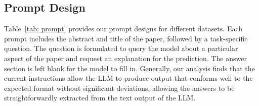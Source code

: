 \documentclass{article}
\begin{document}
\subsection{Prompt Design}


Table~\ref{tab: prompt} provides our prompt designs for different datasets. Each prompt includes the abstract and title of the paper, followed by a task-specific question. The question is formulated to query the model about a particular aspect of the paper and request an explanation for the prediction. The answer section is left blank for the model to fill in. Generally, our analysis finds that the current instructions allow the LLM to produce output that conforms well to the expected format without significant deviations, allowing the answers to be straightforwardly extracted from the text output of the LLM. 
\end{document}
